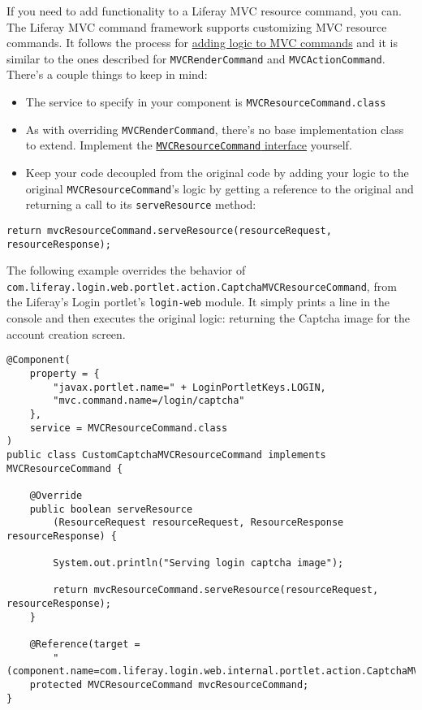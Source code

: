 If you need to add functionality to a Liferay MVC resource command, you
can. The Liferay MVC command framework supports customizing MVC resource
commands. It follows the process for
\href{/docs/7-2/customization/-/knowledge_base/c/adding-logic-to-mvc-commands}{adding
logic to MVC commands} and it is similar to the ones described for
\texttt{MVCRenderCommand} and \texttt{MVCActionCommand}. There's a
couple things to keep in mind:

\begin{itemize}
\item
  The service to specify in your component is
  \texttt{MVCResourceCommand.class}
\item
  As with overriding \texttt{MVCRenderCommand}, there's no base
  implementation class to extend. Implement the
  \href{https://docs.liferay.com/dxp/portal/7.2-latest/javadocs/portal-kernel/com/liferay/portal/kernel/portlet/bridges/mvc/MVCResourceCommand.html}{\texttt{MVCResourceCommand}
  interface} yourself.
\item
  Keep your code decoupled from the original code by adding your logic
  to the original \texttt{MVCResourceCommand}'s logic by getting a
  reference to the original and returning a call to its
  \texttt{serveResource} method:
\end{itemize}

\begin{verbatim}
return mvcResourceCommand.serveResource(resourceRequest, resourceResponse);
\end{verbatim}

The following example overrides the behavior of
\texttt{com.liferay.login.web.portlet.action.CaptchaMVCResourceCommand},
from the Liferay's Login portlet's \texttt{login-web} module. It simply
prints a line in the console and then executes the original logic:
returning the Captcha image for the account creation screen.

\begin{verbatim}
@Component(
    property = { 
        "javax.portlet.name=" + LoginPortletKeys.LOGIN,
        "mvc.command.name=/login/captcha"
    }, 
    service = MVCResourceCommand.class
)
public class CustomCaptchaMVCResourceCommand implements MVCResourceCommand {

    @Override
    public boolean serveResource
        (ResourceRequest resourceRequest, ResourceResponse resourceResponse) {

        System.out.println("Serving login captcha image");

        return mvcResourceCommand.serveResource(resourceRequest, resourceResponse);
    }

    @Reference(target = 
        "(component.name=com.liferay.login.web.internal.portlet.action.CaptchaMVCResourceCommand)")
    protected MVCResourceCommand mvcResourceCommand;
}
\end{verbatim}


